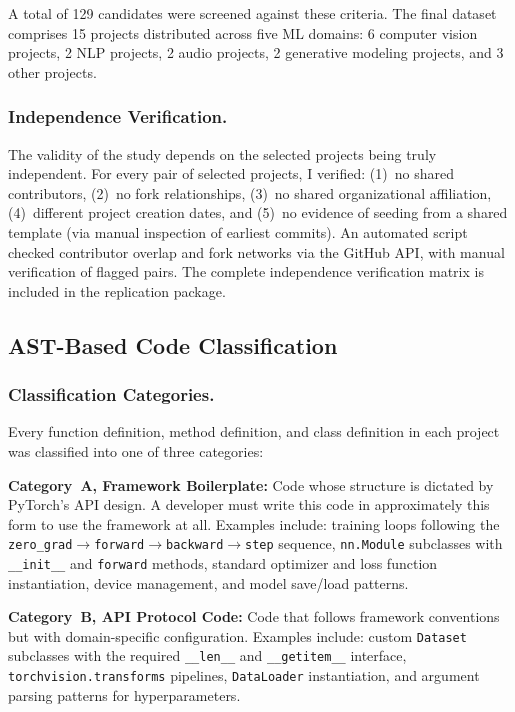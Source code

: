 \documentclass[smallextended,natbib]{svjour3}
\begin{document}
A total of 129 candidates were screened against these criteria. The final dataset comprises 15 projects distributed across five ML domains: 6 computer vision projects, 2 NLP projects, 2 audio projects, 2 generative modeling projects, and 3 other projects.

\subsubsection{Independence Verification.}
The validity of the study depends on the selected projects being truly independent. For every pair of selected projects, I verified: (1)~no shared contributors, (2)~no fork relationships, (3)~no shared organizational affiliation, (4)~different project creation dates, and (5)~no evidence of seeding from a shared template (via manual inspection of earliest commits). An automated script checked contributor overlap and fork networks via the GitHub API, with manual verification of flagged pairs. The complete independence verification matrix is included in the replication package.

\subsection{AST-Based Code Classification}

\subsubsection{Classification Categories.}
Every function definition, method definition, and class definition in each project was classified into one of three categories:

\textbf{Category~A, Framework Boilerplate:} Code whose structure is dictated by PyTorch's API design. A developer must write this code in approximately this form to use the framework at all. Examples include: training loops following the \texttt{zero\_grad}$\rightarrow$\texttt{forward}$\rightarrow$\texttt{backward}$\rightarrow$\texttt{step} sequence, \texttt{nn.Module} subclasses with \texttt{\_\_init\_\_} and \texttt{forward} methods, standard optimizer and loss function instantiation, device management, and model save/load patterns.

\textbf{Category~B, API Protocol Code:} Code that follows framework conventions but with domain-specific configuration. Examples include: custom \texttt{Dataset} subclasses with the required \texttt{\_\_len\_\_} and \texttt{\_\_getitem\_\_} interface, \texttt{torchvision.transforms} pipelines, \texttt{DataLoader} instantiation, and argument parsing patterns for hyperparameters.
\end{document}
